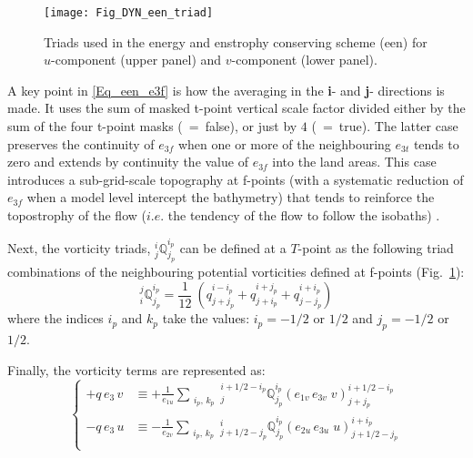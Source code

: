 \documentclass[NEMO_book]{subfiles}
\begin{document}
\begin{figure}[!ht]    \begin{center}
\texttt{[image: Fig\_DYN\_een\_triad]}
\caption{ \label{Fig_DYN_een_triad}  
Triads used in the energy and enstrophy conserving scheme (een) for 
$u$-component (upper panel) and $v$-component (lower panel).}
\end{center}   \end{figure}

A key point in \eqref{Eq_een_e3f} is how the averaging in the \textbf{i}- and \textbf{j}- directions is made. 
It uses the sum of masked t-point vertical scale factor divided either 
by the sum of the four t-point masks (~=~false), 
or  just by $4$ (~=~true).
The latter case preserves the continuity of $e_{3f}$ when one or more of the neighbouring $e_{3t}$ 
tends to zero and extends by continuity the value of $e_{3f}$ into the land areas. 
This case introduces a sub-grid-scale topography at f-points (with a systematic reduction of $e_{3f}$ 
when a model level intercept the bathymetry) that tends to reinforce the topostrophy of the flow 
($i.e.$ the tendency of the flow to follow the isobaths) \citep{Penduff_al_OS07}. 

Next, the vorticity triads, $ {^i_j}\mathbb{Q}^{i_p}_{j_p}$ can be defined at a $T$-point as 
the following triad combinations of the neighbouring potential vorticities defined at f-points 
(Fig.~\ref{Fig_DYN_een_triad}): 
\begin{equation} \label{Q_triads}
_i^j \mathbb{Q}^{i_p}_{j_p}
= \frac{1}{12} \ \left(   q^{i-i_p}_{j+j_p} + q^{i+j_p}_{j+i_p} + q^{i+i_p}_{j-j_p}  \right)
\end{equation}
where the indices $i_p$ and $k_p$ take the values: $i_p = -1/2$ or $1/2$ and $j_p = -1/2$ or $1/2$. 

Finally, the vorticity terms are represented as: 
\begin{equation} \label{Eq_dynvor_een}
\left\{ {
\begin{aligned}
 +q\,e_3 \, v 	&\equiv +\frac{1}{e_{1u} }   \sum_{\substack{i_p,\,k_p}} 
                         {^{i+1/2-i_p}_j}  \mathbb{Q}^{i_p}_{j_p}  \left( e_{1v}\,e_{3v} \;v  \right)^{i+1/2-i_p}_{j+j_p}   \\
 - q\,e_3 \, u     &\equiv -\frac{1}{e_{2v} }    \sum_{\substack{i_p,\,k_p}} 
                         {^i_{j+1/2-j_p}}  \mathbb{Q}^{i_p}_{j_p}  \left( e_{2u}\,e_{3u} \;u  \right)^{i+i_p}_{j+1/2-j_p}   \\
\end{aligned} 
} \right.
\end{equation} 
\end{document}
